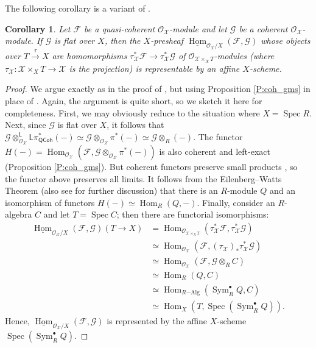 \documentclass[a4paper]{amsart}
\theoremstyle{plain}
\newtheorem{corollary}[theorem]{Corollary}
\theoremstyle{definition}
\theoremstyle{remark}
\numberwithin{equation}{section}
\newcommand\cF{\mathcal{F}}
\newcommand\cG{\mathcal{G}}
\newcommand\cX{\mathcal{X}}
\newcommand\oh{\mathcal{O}}
\newcommand\co{\colon}
\DeclareMathOperator{\Spec}{Spec}
\DeclareMathOperator{\Sym}{Sym}
\newcommand{\tensor}{\otimes}
\newcommand{\QCoh}{\mathsf{QCoh}}
\DeclareMathOperator{\Hom}{Hom}
\newcommand{\DERF}[1]{\mathsf{{#1}}}
\newcommand{\LDERF}{\DERF{L}}
\newcommand{\shv}[1]{\mathcal{{#1}}}
\begin{document}
The following corollary is a variant of \cite[Thm.~D]{hallj_coho_bc}.
\begin{corollary}\label{C:aff_hom_fund}
  Let $\cF$ be a quasi-coherent $\oh_{\cX}$-module and let $\cG$ be a coherent $\oh_{\cX}$-module. If $\cG$ is flat over $X$, then the $X$-presheaf $\underline{\Hom}_{\oh_{\cX}/X}(\cF,\cG)$ whose objects over $T \xrightarrow{\tau} X$ are homomorphisms $\tau_{\cX}^*\cF \to \tau_{\cX}^*\cG$ of $\oh_{\cX\times_X T}$-modules (where $\tau_{\cX} \co \cX \times_X T \to \cX$ is the projection) 
  is representable by an affine $X$-scheme. 
\end{corollary}
\begin{proof}
  We argue exactly as in the proof of \cite[Thm.~D]{hallj_coho_bc}, but
  using Proposition \ref{P:coh_gms} in place of
  \cite[Thm.~C]{hallj_coho_bc}. Again, the argument is quite short, so
  we sketch it here for completeness. First, we may obviously reduce
  to the situation where $X=\Spec R$. Next, since $\shv{G}$ is flat
  over $X$, it follows that
  $\shv{G} \tensor^{\LDERF}_{\oh_{\cX}} \LDERF \pi^*_{\QCoh}(-)
  \simeq \shv{G} \tensor_{\oh_{\cX}} \pi^*(-)\simeq \shv{G}
  \tensor_R (-)$. The functor
  $H(-)= \Hom_{\oh_{\cX}}(\shv{F},\shv{G} \tensor_{\oh_{\cX}}
  \pi^*(-))$ is also coherent and left-exact (Proposition \ref{P:coh_gms}). But coherent functors
  preserve small products \cite[Ex.~4.8]{hallj_coho_bc}, so the
  functor above preserves all limits. It follows from the
  Eilenberg--Watts Theorem \cite[Thm.~6]{MR0118757} (also see
  \cite[Ex.~4.10]{hallj_coho_bc} for further discussion) that there is
  an $R$-module $Q$ and an isomorphism of functors
  $H(-) \simeq \Hom_{R}(Q,-)$. Finally, consider an $R$-algebra $C$
  and let $T=\Spec C$; then there are functorial isomorphisms:
  \begin{align*}
    \underline{\Hom}_{\oh_{\cX}/X}(\shv{F},\shv{G})(T \to X) &= \Hom_{\oh_{\cX\times_X T}}(\tau_{\cX}^*\shv{F},\tau_{\cX}^*\shv{G})\\
                                                               &\simeq \Hom_{\oh_{\cX}}(\shv{F},(\tau_{\cX})_*\tau_{\cX}^*\shv{G})\\
                                                               &\simeq \Hom_{\oh_{\cX}}(\shv{F},\shv{G} \otimes_R C)\\
                                                               &\simeq \Hom_{R}(Q,C)\\
                                                               &\simeq \Hom_{R\mathrm{-Alg}}(\Sym^{\bullet}_RQ,C)\\
                                                               &\simeq \Hom_X(T,\Spec (\Sym^{\bullet}_RQ)).
  \end{align*}
  Hence, 
  $\underline{\Hom}_{\oh_{\cX}/X}(\cF,\cG)$ is represented by the
  affine $X$-scheme $\Spec (\Sym_R^{\bullet} Q)$.
\end{proof}
\end{document}
